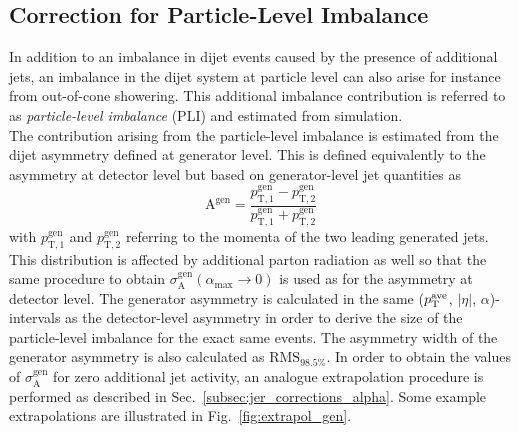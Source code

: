 \subsection{Correction for Particle-Level Imbalance}
\label{subsec:jer_corrections_pli}
In addition to an imbalance in dijet events caused by the presence of additional jets, an imbalance in the dijet system at particle level can also arise for instance from out-of-cone showering. This additional imbalance contribution is referred to as \textit{particle-level imbalance} (PLI) and estimated from simulation. \\
The contribution arising from the particle-level imbalance is estimated from the dijet asymmetry defined at generator level. This is defined equivalently to the asymmetry at detector level but based on generator-level jet quantities as
\begin{equation}
  \mathrm{A^{gen}} = \frac{p_\mathrm{T,1}^\mathrm{gen} - p_\mathrm{T,2}^\mathrm{gen}}{p_\mathrm{T,1}^\mathrm{gen} + p_\mathrm{T,2}^\mathrm{gen}} 
 \end{equation}
with $p_\mathrm{T,1}^\mathrm{gen}$ and $p_\mathrm{T,2}^\mathrm{gen}$ referring to the momenta of the two leading generated jets. This distribution is affected by additional parton radiation as well so that the same procedure to obtain $\sigma^\mathrm{gen}_\mathrm{A}(\alpha_\mathrm{max} \rightarrow 0)$ is used as for the asymmetry at detector level. The generator asymmetry is calculated in the same ($p_{\text{T}}^\mathrm{ave}$, $|\eta|$, $\alpha$)-intervals as the detector-level asymmetry in order to derive the size of the particle-level imbalance for the exact same events. The asymmetry width of the generator asymmetry is also calculated as $\mathrm{RMS}_{98.5\%}$. In order to obtain the values of $\sigma^\mathrm{gen}_\mathrm{A}$ for zero additional jet activity, an analogue extrapolation procedure is performed as described in Sec.~\ref{subsec:jer_corrections_alpha}. Some example extrapolations are illustrated in Fig.~\ref{fig:extrapol_gen}. 
